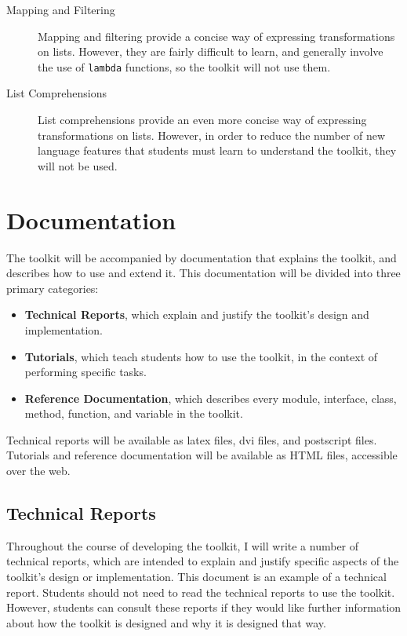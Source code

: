 \documentclass{article}
\begin{document}
\begin{description}
  \item[Mapping and Filtering] Mapping and filtering provide a
  concise way of expressing transformations on lists.  However, they
  are fairly difficult to learn, and generally involve the use of
  \texttt{lambda} functions, so the toolkit will not use them.

  \item[List Comprehensions] List comprehensions provide an even more
  concise way of expressing transformations on lists.  However, in
  order to reduce the number of new language features that students
  must learn to understand the toolkit, they will not be used.

\end{description}

\section{Documentation}

The toolkit will be accompanied by documentation that explains the
toolkit, and describes how to use and extend it.  This documentation
will be divided into three primary categories:

\begin{itemize}
  \item \textbf{Technical Reports}, which explain and justify the
  toolkit's design and implementation.

  \item \textbf{Tutorials}, which teach students how to use the
  toolkit, in the context of performing specific tasks.

  \item \textbf{Reference Documentation}, which describes every
  module, interface, class, method, function, and variable in the
  toolkit.
\end{itemize}

Technical reports will be available as latex files, dvi files, and
postscript files.  Tutorials and reference documentation will be
available as HTML files, accessible over the web.

\subsection{Technical Reports}

Throughout the course of developing the toolkit, I will write a number
of technical reports, which are intended to explain and justify
specific aspects of the toolkit's design or implementation.  This
document is an example of a technical report.  Students should not
need to read the technical reports to use the toolkit.  However,
students can consult these reports if they would like further
information about how the toolkit is designed and why it is designed
that way.
\end{document}
